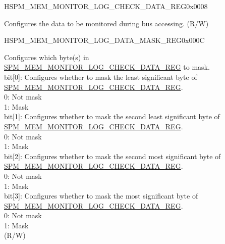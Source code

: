 \begin{register}{H}{SPM\_MEM\_MONITOR\_LOG\_CHECK\_DATA\_REG}{0x0008}\label{regdesc:SPMMEMMONITORLOGCHECKDATAREG}
%
\regnewline%
\begin{regdesc}\begin{reglist}
\label{fielddesc:SPMMEMMONITORLOGCHECKDATA}\item [SPM\_MEM\_MONITOR\_LOG\_CHECK\_DATA] Configures the data to be monitored during bus accessing. (R/W)
\end{reglist}\end{regdesc}
\end{register}


\begin{register}{H}{SPM\_MEM\_MONITOR\_LOG\_DATA\_MASK\_REG}{0x000C}\label{regdesc:SPMMEMMONITORLOGDATAMASKREG}
%
%
\regnewline%
\begin{regdesc}\begin{reglist}
\label{fielddesc:SPMMEMMONITORLOGDATAMASK}\item[SPM\_MEM\_MONITOR\_LOG\_DATA\_MASK] Configures which byte(s) in \hyperref[regdesc:SPMMEMMONITORLOGCHECKDATAREG]{SPM\_MEM\_MONITOR\_LOG\_CHECK\_DATA\_REG} to mask.\\
bit[0]: Configures whether to mask the least significant byte of \hyperref[regdesc:SPMMEMMONITORLOGCHECKDATAREG]{SPM\_MEM\_MONITOR\_LOG\_CHECK\_DATA\_REG}.\\
0: Not mask\\
1: Mask\\
bit[1]: Configures whether to mask the second least significant byte of \hyperref[regdesc:SPMMEMMONITORLOGCHECKDATAREG]{SPM\_MEM\_MONITOR\_LOG\_CHECK\_DATA\_REG}.\\
0: Not mask\\
1: Mask\\
bit[2]: Configures whether to mask the second most significant byte of \hyperref[regdesc:SPMMEMMONITORLOGCHECKDATAREG]{SPM\_MEM\_MONITOR\_LOG\_CHECK\_DATA\_REG}.\\
0: Not mask\\
1: Mask\\
bit[3]: Configures whether to mask the most significant byte of \hyperref[regdesc:SPMMEMMONITORLOGCHECKDATAREG]{SPM\_MEM\_MONITOR\_LOG\_CHECK\_DATA\_REG}.\\
0: Not mask\\
1: Mask\\
(R/W)
\end{reglist}\end{regdesc}
\end{register}


